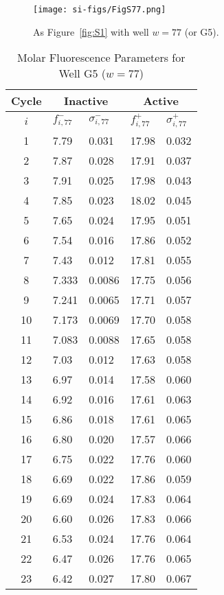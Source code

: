                 \begin{figure}
                    \centering
                    \texttt{[image: si-figs/FigS77.png]}
                    \caption{
                        As Figure~\ref{fig:S1} with well $w=77$ (or G5).
                    }
                \end{figure}
                \clearpage
    \begin{table}
        \caption{Molar Fluorescence Parameters for Well G5 ($w=77$)}
        \centering
        \begin{tabular}{c|ll|ll}
            Cycle & \multicolumn{2}{c|}{Inactive} & \multicolumn{2}{c}{Active} \\
            \hline
            $i$ & $f_{i,77}^{-}$ & $\sigma_{i,77}^{-}$ &  $f_{i,77}^{+}$ & $\sigma_{i,77}^{+}$ \\
            \hline
    1 & 7.79 & 0.031 & 17.98 & 0.032 \\
2 & 7.87 & 0.028 & 17.91 & 0.037 \\
3 & 7.91 & 0.025 & 17.98 & 0.043 \\
4 & 7.85 & 0.023 & 18.02 & 0.045 \\
5 & 7.65 & 0.024 & 17.95 & 0.051 \\
6 & 7.54 & 0.016 & 17.86 & 0.052 \\
7 & 7.43 & 0.012 & 17.81 & 0.055 \\
8 & 7.333 & 0.0086 & 17.75 & 0.056 \\
9 & 7.241 & 0.0065 & 17.71 & 0.057 \\
10 & 7.173 & 0.0069 & 17.70 & 0.058 \\
11 & 7.083 & 0.0088 & 17.65 & 0.058 \\
12 & 7.03 & 0.012 & 17.63 & 0.058 \\
13 & 6.97 & 0.014 & 17.58 & 0.060 \\
14 & 6.92 & 0.016 & 17.61 & 0.063 \\
15 & 6.86 & 0.018 & 17.61 & 0.065 \\
16 & 6.80 & 0.020 & 17.57 & 0.066 \\
17 & 6.75 & 0.022 & 17.76 & 0.060 \\
18 & 6.69 & 0.022 & 17.86 & 0.059 \\
19 & 6.69 & 0.024 & 17.83 & 0.064 \\
20 & 6.60 & 0.026 & 17.83 & 0.066 \\
21 & 6.53 & 0.024 & 17.76 & 0.064 \\
22 & 6.47 & 0.026 & 17.76 & 0.065 \\
23 & 6.42 & 0.027 & 17.80 & 0.067 \\

\end{tabular}
\end{table}
